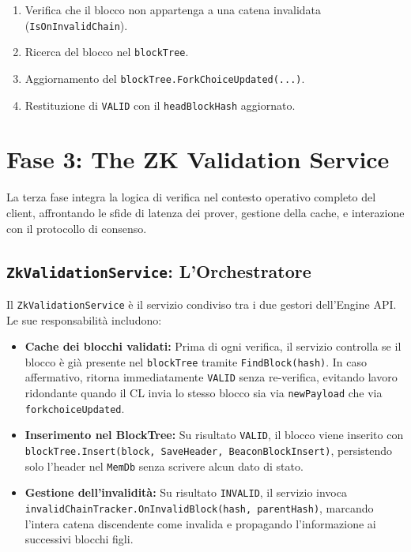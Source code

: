 \documentclass[12pt,a4paper,openright,twoside]{report}
\begin{document}
\begin{enumerate}
    \item Verifica che il blocco non appartenga a una catena invalidata (\texttt{IsOnInvalidChain}).
    \item Ricerca del blocco nel \texttt{blockTree}.
    \item Aggiornamento del \texttt{blockTree.ForkChoiceUpdated(...)}.
    \item Restituzione di \texttt{VALID} con il \texttt{headBlockHash} aggiornato.
\end{enumerate}

\section{Fase 3: The ZK Validation Service}\label{sec:validation_service}

La terza fase integra la logica di verifica nel contesto operativo completo del client, affrontando le sfide di latenza dei prover, gestione della cache, e interazione con il protocollo di consenso.

\subsection{\texttt{ZkValidationService}: L'Orchestratore}

Il \texttt{ZkValidationService} è il servizio condiviso tra i due gestori dell'Engine API. Le sue responsabilità includono:

\begin{itemize}
    \item \textbf{Cache dei blocchi validati:} Prima di ogni verifica, il servizio controlla se il blocco è già presente nel \texttt{blockTree} tramite \texttt{FindBlock(hash)}. In caso affermativo, ritorna immediatamente \texttt{VALID} senza re-verifica, evitando lavoro ridondante quando il CL invia lo stesso blocco sia via \texttt{newPayload} che via \\\texttt{forkchoiceUpdated}.

    \item \textbf{Inserimento nel BlockTree:} Su risultato \texttt{VALID}, il blocco viene inserito con \\\texttt{blockTree.Insert(block, SaveHeader, BeaconBlockInsert)}, persistendo solo l'header nel \texttt{MemDb} senza scrivere alcun dato di stato.

    \item \textbf{Gestione dell'invalidità:} Su risultato \texttt{INVALID}, il servizio invoca \texttt{invalidChainTracker.OnInvalidBlock(hash, parentHash)}, marcando l'intera catena discendente come invalida e propagando l'informazione ai successivi blocchi figli.
\end{itemize}
\end{document}
